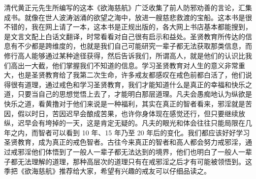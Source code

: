\begin{book}[《欲海慈航》]
    清代黄正元先生所编写的这本《欲海慈航》广泛收集了前人防邪劝善的言论，汇集成书。就像在世人波涛汹涌的欲望之海中，放进一艘慈悲救渡的宝船。这本书是很不错的，我在网上请了一本，这本书是正规出版的，各大网上书店基本都能搜到，是文言文配上白话文翻译，时常看看对自己很有启示和益处。圣贤教育所传达的信息有不少都是跨维度的，也就是我们自己可能研究一辈子都无法获取那类信息，而修行高人能够通过某种途径获得，然后告诉我们，所谓高人，就是他们的认识比我们高出一大截，他们掌握我们不知道的信息。学习圣贤教育对人生的意义非常重大，也是圣贤教育给了我第二次生命，许多戒友都感叹在戒色前都白活了，他们说得很有道理，通过戒色和学习圣贤教育，我们才能知道什么是真正的幸福和快乐之道，只要当自己的思想觉悟上去了，才能明白那层道理。凡夫会愚痴地认为纵欲是快乐之道，看黄撸对于他们来说是一种福利，其实在真正的智者看来，邪淫就是苦因，假以时日，苦因迟早会酿成苦果，也许你身体现在感觉还行，但只要继续放纵，迟早会有垮掉的一天，这是肯定无疑的。凡夫的眼光和体会往往只能局限在几年之内，而智者可以看到 10 年、15 年乃至 20 年后的变化。我们都应该好好学习圣贤教育，成为真正的戒色智者。古往今来真正的智者和高人都会努力戒邪淫，通过戒邪淫他们体悟到了一般人一辈子都无法达到的境界，他们也明白了一般人一辈子都无法理解的道理，那种高层次的道理只有在戒邪淫之后才有可能被领悟到。这季把《欲海慈航》推荐给大家，希望有兴趣的戒友可以仔细品读之。
\end{book}
